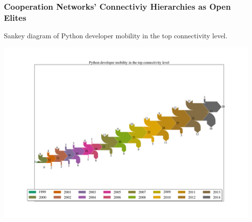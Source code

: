 \documentclass[ignorenonframetext,red,8pt]{beamer}
\begin{document}
\begin{frame}
\frametitle{Cooperation Networks' Connectiviy Hierarchies as Open Elites}

Sankey diagram of Python developer mobility in the top connectivity level.

\begin{center}
\includegraphics[scale=0.2]{../../figures/sankey_mobility_python_years}
\end{center}

\end{frame}
\end{document}

